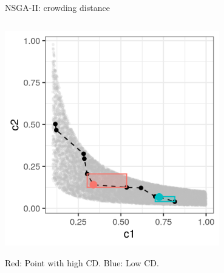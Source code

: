 \begin{frame}[allowframebreaks]{NSGA-II: crowding distance}
\begin{columns}
\begin{column}{0.5\textwidth}
\begin{center}
\includegraphics[width = 0.7\textwidth]{images/NSGA2_CS2.png}

\begin{footnotesize}
Red: Point with high CD. Blue: Low CD.
\end{footnotesize}
\end{center}
\end{column}
\end{columns}


\framebreak




\end{frame}
